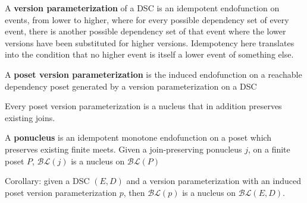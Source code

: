 \documentclass{beamer}
\newcommand{\BLc}{\mathcal{BL}}
\begin{document}
\begin{frame}
\begin{definition}
A \textbf{version parameterization} of a DSC is an idempotent endofunction on events, from lower to higher, where for every possible dependency set of every event, there is another possible dependency set of that event where the lower versions have been substituted for higher versions. Idempotency here translates into the condition that no higher event is itself a lower event of something else.

A \textbf{poset version parameterization} is the induced endofunction on a reachable dependency poset generated by a version parameterization on a DSC
\end{definition}

\end{frame}

\begin{frame}
\begin{lemma}
Every poset version parameterization is a nucleus that in addition preserves existing joins.
\end{lemma}

\begin{theorem}
A \textbf{ponucleus} is an idempotent monotone endofunction on a poset which preserves existing finite meets.
Given a join-preserving ponucleus \(j\), on a finite poset \(P\),  \(\BLc(j)\) is a nucleus on \(\BLc(P)\)
\end{theorem}

Corollary: given a DSC \((E,D)\) and a version parameterization with an induced poset version parameterization \(p\), then \(\BLc(p)\) is a nucleus on \(\BLc(E,D)\).
\end{frame}
\end{document}

